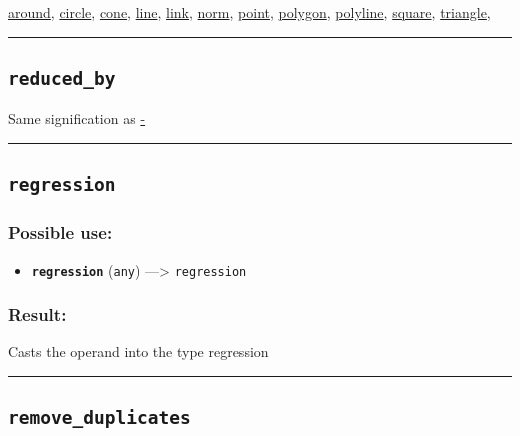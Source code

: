 \documentclass[]{book}
\providecommand{\tightlist}{%
  \setlength{\itemsep}{0pt}\setlength{\parskip}{0pt}}
\theoremstyle{definition}
\theoremstyle{definition}
\theoremstyle{definition}
\theoremstyle{remark}
\begin{document}
\href{OperatorsAA\#around}{around}, \href{OperatorsBC\#circle}{circle},
\href{OperatorsBC\#cone}{cone}, \href{OperatorsIM\#line}{line},
\href{OperatorsIM\#link}{link}, \href{OperatorsNR\#norm}{norm},
\href{OperatorsNR\#point}{point}, \href{OperatorsNR\#polygon}{polygon},
\href{OperatorsNR\#polyline}{polyline},
\href{OperatorsSZ\#square}{square},
\href{OperatorsSZ\#triangle}{triangle},

\begin{center}\rule{0.5\linewidth}{\linethickness}\end{center}

\subsection{\texorpdfstring{\texttt{reduced\_by}}{reduced\_by}}\label{reduced_by}

Same signification as \href{OperatorsAA\#-}{-}

\begin{center}\rule{0.5\linewidth}{\linethickness}\end{center}

\subsection{\texorpdfstring{\texttt{regression}}{regression}}\label{regression}

\subsubsection{Possible use:}\label{possible-use-431}

\begin{itemize}
\tightlist
\item
  \textbf{\texttt{regression}} (\texttt{any}) ---\textgreater{}
  \texttt{regression}
\end{itemize}

\subsubsection{Result:}\label{result-417}

Casts the operand into the type regression

\begin{center}\rule{0.5\linewidth}{\linethickness}\end{center}

\subsection{\texorpdfstring{\texttt{remove\_duplicates}}{remove\_duplicates}}\label{remove_duplicates}
\end{document}
